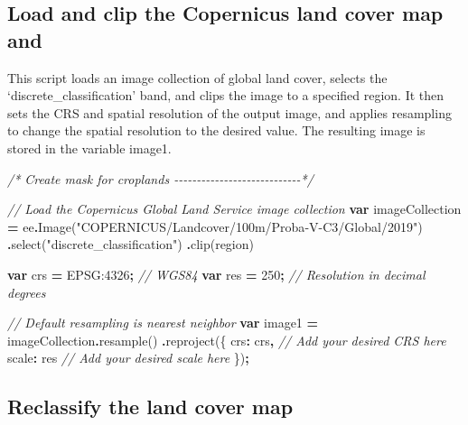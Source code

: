 \documentclass[
  10pt,
  b5paper,
  oneside]{book}
\newenvironment{Shaded}{\begin{snugshade}}{\end{snugshade}}
\newcommand{\CommentTok}[1]{\textcolor[rgb]{0.56,0.35,0.01}{\textit{#1}}}
\newcommand{\DataTypeTok}[1]{\textcolor[rgb]{0.13,0.29,0.53}{#1}}
\newcommand{\DecValTok}[1]{\textcolor[rgb]{0.00,0.00,0.81}{#1}}
\newcommand{\FunctionTok}[1]{\textcolor[rgb]{0.00,0.00,0.00}{#1}}
\newcommand{\KeywordTok}[1]{\textcolor[rgb]{0.13,0.29,0.53}{\textbf{#1}}}
\newcommand{\NormalTok}[1]{#1}
\newcommand{\OperatorTok}[1]{\textcolor[rgb]{0.81,0.36,0.00}{\textbf{#1}}}
\newcommand{\StringTok}[1]{\textcolor[rgb]{0.31,0.60,0.02}{#1}}
\begin{document}
\hypertarget{load-and-clip-the-copernicus-land-cover-map-and}{%
\subsection{Load and clip the Copernicus land cover map and}\label{load-and-clip-the-copernicus-land-cover-map-and}}

This script loads an image collection of global land cover, selects the `discrete\_classification' band, and clips the image to a specified region. It then sets the CRS and spatial resolution of the output image, and applies resampling to change the spatial resolution to the desired value. The resulting image is stored in the variable image1.

\begin{Shaded}
\begin{Highlighting}[]
\CommentTok{/* Create mask for croplands {-}{-}{-}{-}{-}{-}{-}{-}{-}{-}{-}{-}{-}{-}{-}{-}{-}{-}{-}{-}{-}{-}{-}{-}{-}{-}{-}{-}*/}

\CommentTok{// Load the Copernicus Global Land Service image collection}
\KeywordTok{var}\NormalTok{ imageCollection }\OperatorTok{=} 
\NormalTok{ee}\OperatorTok{.}\FunctionTok{Image}\NormalTok{(}\StringTok{"COPERNICUS/Landcover/100m/Proba{-}V{-}C3/Global/2019"}\NormalTok{)}
  \OperatorTok{.}\FunctionTok{select}\NormalTok{(}\StringTok{"discrete\_classification"}\NormalTok{)}
  \OperatorTok{.}\FunctionTok{clip}\NormalTok{(region)}

\KeywordTok{var}\NormalTok{ crs }\OperatorTok{=} \StringTok{\textquotesingle{}EPSG:4326\textquotesingle{}}\OperatorTok{;} \CommentTok{// WGS84}
\KeywordTok{var}\NormalTok{ res }\OperatorTok{=} \DecValTok{250}\OperatorTok{;} \CommentTok{// Resolution in decimal degrees}

\CommentTok{// Default resampling is nearest neighbor}
\KeywordTok{var}\NormalTok{ image1 }\OperatorTok{=}\NormalTok{ imageCollection}\OperatorTok{.}\FunctionTok{resample}\NormalTok{()}
  \OperatorTok{.}\FunctionTok{reproject}\NormalTok{(\{}
    \DataTypeTok{crs}\OperatorTok{:}\NormalTok{ crs}\OperatorTok{,} \CommentTok{// Add your desired CRS here}
    \DataTypeTok{scale}\OperatorTok{:}\NormalTok{ res }\CommentTok{// Add your desired scale here}
\NormalTok{  \})}\OperatorTok{;}
\end{Highlighting}
\end{Shaded}

\hypertarget{reclassify-the-land-cover-map}{%
\subsection{Reclassify the land cover map}\label{reclassify-the-land-cover-map}}
\end{document}

